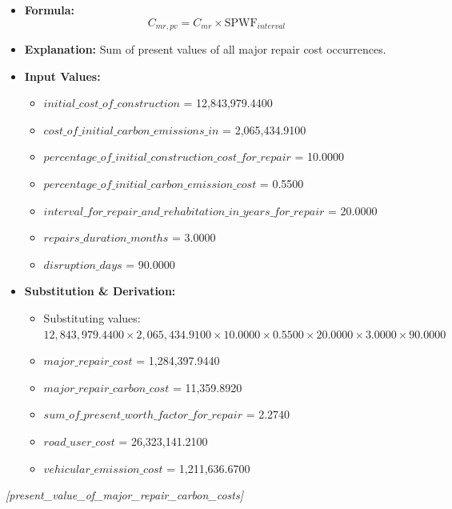 \documentclass[12pt,a4paper]{article}
\begin{document}
\begin{itemize}
  \item \textbf{Formula:} $$C_{mr,pv} = C_{mr} \times \text{SPWF}_{interval}$$
  \item \textbf{Explanation:} Sum of present values of all major repair cost occurrences.
  \item \textbf{Input Values:}
  \begin{itemize}
    \item $initial\_cost\_of\_construction$ = 12,843,979.4400
    \item $cost\_of\_initial\_carbon\_emissions\_in$ = 2,065,434.9100
    \item $percentage\_of\_initial\_construction\_cost\_for\_repair$ = 10.0000
    \item $percentage\_of\_initial\_carbon\_emission\_cost$ = 0.5500
    \item $interval\_for\_repair\_and\_rehabitation\_in\_years\_for\_repair$ = 20.0000
    \item $repairs\_duration\_months$ = 3.0000
    \item $disruption\_days$ = 90.0000
  \end{itemize}
  \item \textbf{Substitution \& Derivation:}
  \begin{itemize}
    \item Substituting values: $12,843,979.4400 \times 2,065,434.9100 \times 10.0000 \times 0.5500 \times 20.0000 \times 3.0000 \times 90.0000$
    \item $major\_repair\_cost$ = 1,284,397.9440
    \item $major\_repair\_carbon\_cost$ = 11,359.8920
    \item $sum\_of\_present\_worth\_factor\_for\_repair$ = 2.2740
    \item $road\_user\_cost$ = 26,323,141.2100
    \item $vehicular\_emission\_cost$ = 1,211,636.6700
  \end{itemize}
\end{itemize}


\textit{[present\_value\_of\_major\_repair\_carbon\_costs]}
\end{document}
